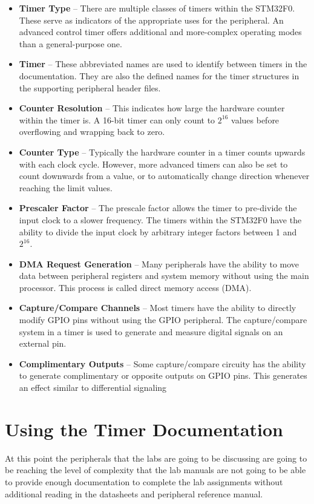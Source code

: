 \documentclass[11pt,fleqn]{book} %
\begin{document}
        \begin{itemize}
            \item \textbf{Timer Type} -- There are multiple classes of timers within the STM32F0. These serve as indicators of the appropriate uses for the peripheral. An advanced control timer offers additional and more-complex operating modes than a general-purpose one. 
            \item \textbf{Timer} -- These abbreviated names are used to identify between timers in the documentation. They are also the defined names for the timer structures in the supporting peripheral header files. 
            \item \textbf{Counter Resolution} -- This indicates how large the hardware counter within the timer is. A 16-bit timer can only count to $2^{16}$ values before overflowing and wrapping back to zero. 
            \item \textbf{Counter Type} -- Typically the hardware counter in a timer counts upwards with each clock cycle. However, more advanced timers can also be set to count downwards from a value, or to automatically change direction whenever reaching the limit values. 
            \item \textbf{Prescaler Factor} -- The prescale factor allows the timer to pre-divide the input clock to a slower frequency. The timers within the STM32F0 have the ability to divide the input clock by arbitrary integer factors between 1 and $2^{16}$.
            \item \textbf{DMA Request Generation} -- Many peripherals have the ability to move data between peripheral registers and system memory without using the main processor. This process is called direct memory access (DMA).
            \item \textbf{Capture/Compare Channels} -- Most timers have the ability to directly modify GPIO pins without using the GPIO peripheral. The capture/compare system in a timer is used to generate and measure digital signals on an external pin. 
            \item \textbf{Complimentary Outputs} -- Some capture/compare circuity has the ability to generate complimentary or opposite outputs on GPIO pins. This generates an effect similar to differential signaling 
        \end{itemize}
        
  

\section{Using the Timer Documentation}
    At this point the peripherals that the labs are going to be discussing are going to be reaching the level of complexity that the lab manuals are not going to be able to provide enough documentation to complete the lab assignments without additional reading in the datasheets and peripheral reference manual. 
    
\end{document}
